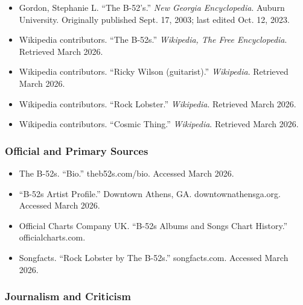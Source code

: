 \documentclass[11pt,letterpaper]{article}
\begin{document}
\begin{itemize}[noitemsep]
  \item Gordon, Stephanie L. ``The B-52's.'' \textit{New Georgia Encyclopedia}. Auburn University. Originally published Sept. 17, 2003; last edited Oct. 12, 2023.
  \item Wikipedia contributors. ``The B-52s.'' \textit{Wikipedia, The Free Encyclopedia}. Retrieved March 2026.
  \item Wikipedia contributors. ``Ricky Wilson (guitarist).'' \textit{Wikipedia}. Retrieved March 2026.
  \item Wikipedia contributors. ``Rock Lobster.'' \textit{Wikipedia}. Retrieved March 2026.
  \item Wikipedia contributors. ``Cosmic Thing.'' \textit{Wikipedia}. Retrieved March 2026.
\end{itemize}

\subsubsection{Official and Primary Sources}

\begin{itemize}[noitemsep]
  \item The B-52s. ``Bio.'' theb52s.com/bio. Accessed March 2026.
  \item ``B-52s Artist Profile.'' Downtown Athens, GA. downtownathensga.org. Accessed March 2026.
  \item Official Charts Company UK. ``B-52s Albums and Songs Chart History.'' officialcharts.com.
  \item Songfacts. ``Rock Lobster by The B-52s.'' songfacts.com. Accessed March 2026.
\end{itemize}

\subsubsection{Journalism and Criticism}
\end{document}
